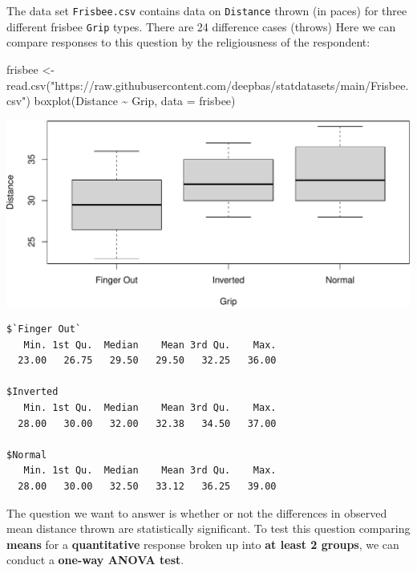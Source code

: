 \documentclass[
]{book}
\newenvironment{Shaded}{\begin{snugshade}}{\end{snugshade}}
\newcommand{\AttributeTok}[1]{\textcolor[rgb]{0.77,0.63,0.00}{#1}}
\newcommand{\FunctionTok}[1]{\textcolor[rgb]{0.00,0.00,0.00}{#1}}
\newcommand{\NormalTok}[1]{#1}
\newcommand{\OtherTok}[1]{\textcolor[rgb]{0.56,0.35,0.01}{#1}}
\newcommand{\SpecialCharTok}[1]{\textcolor[rgb]{0.00,0.00,0.00}{#1}}
\newcommand{\StringTok}[1]{\textcolor[rgb]{0.31,0.60,0.02}{#1}}
\begin{document}
The data set \texttt{Frisbee.csv} contains data on \texttt{Distance} thrown (in paces) for three different frisbee \texttt{Grip} types. There are 24 difference cases (throws) Here we can compare responses to this question by the religiousness of the respondent:

\begin{Shaded}
\begin{Highlighting}[]
\NormalTok{frisbee }\OtherTok{\textless{}{-}} \FunctionTok{read.csv}\NormalTok{(}\StringTok{"https://raw.githubusercontent.com/deepbas/statdatasets/main/Frisbee.csv"}\NormalTok{)}
\FunctionTok{boxplot}\NormalTok{(Distance }\SpecialCharTok{\textasciitilde{}}\NormalTok{ Grip, }\AttributeTok{data =}\NormalTok{ frisbee)}
\end{Highlighting}
\end{Shaded}

\includegraphics[width=1\linewidth]{Class_Activity_22_files/figure-latex/unnamed-chunk-1-1}

\begin{Shaded}
\end{Shaded}

\begin{verbatim}
$`Finger Out`
   Min. 1st Qu.  Median    Mean 3rd Qu.    Max. 
  23.00   26.75   29.50   29.50   32.25   36.00 

$Inverted
   Min. 1st Qu.  Median    Mean 3rd Qu.    Max. 
  28.00   30.00   32.00   32.38   34.50   37.00 

$Normal
   Min. 1st Qu.  Median    Mean 3rd Qu.    Max. 
  28.00   30.00   32.50   33.12   36.25   39.00 
\end{verbatim}

The question we want to answer is whether or not the differences in observed mean distance thrown are statistically significant. To test this question comparing \textbf{means} for a \textbf{quantitative} response broken up into \textbf{at least 2 groups}, we can conduct a \textbf{one-way ANOVA test}.
\end{document}

